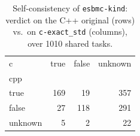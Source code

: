 \begin{table}[t]
  \centering
  \caption{Self-consistency of \texttt{esbmc-kind}: verdict on the C++ original (rows) vs.\ on \texttt{c-exact_std} (columns), over 1010 shared tasks.}
  \label{tab:selfpair-esbmc-kind-c-exact_std}
\begin{tabular}{lrrr}
\toprule
c & true & false & unknown \\
cpp &  &  &  \\
\midrule
true & 169 & 19 & 357 \\
false & 27 & 118 & 291 \\
unknown & 5 & 2 & 22 \\
\bottomrule
\end{tabular}
\end{table}
